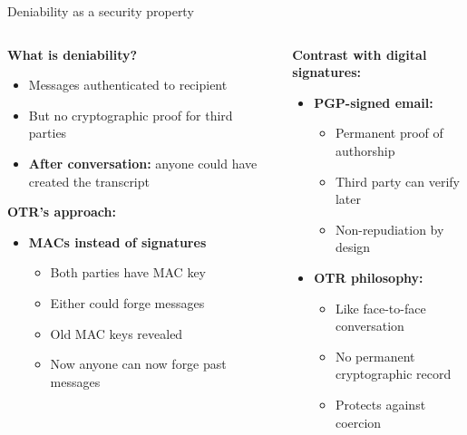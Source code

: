 \documentclass[aspectratio=169, lualatex, handout]{beamer}
\begin{document}
\begin{frame}{Deniability as a security property}
	\begin{columns}[c]
		\begin{column}{0.5\textwidth}
			\textbf{What is deniability?}
			\begin{itemize}
				\item Messages authenticated to recipient
				\item But no cryptographic proof for third parties
				\item \textbf{After conversation:} anyone could have created the transcript
			\end{itemize}
			\textbf{OTR's approach:}
			\begin{itemize}
				\item \textbf{MACs instead of signatures}
				      \begin{itemize}
					      \item Both parties have MAC key
					      \item Either could forge messages
					      \item Old MAC keys revealed
					      \item Now anyone can now forge past messages
				      \end{itemize}
			\end{itemize}
		\end{column}
		\begin{column}{0.5\textwidth}
			\textbf{Contrast with digital signatures:}
			\begin{itemize}
				\item \textbf{PGP-signed email:}
				      \begin{itemize}
					      \item Permanent proof of authorship
					      \item Third party can verify later
					      \item Non-repudiation by design
				      \end{itemize}
				\item \textbf{OTR philosophy:}
				      \begin{itemize}
					      \item Like face-to-face conversation
					      \item No permanent cryptographic record
					      \item Protects against coercion
				      \end{itemize}
			\end{itemize}
		\end{column}
	\end{columns}
\end{frame}
\end{document}
